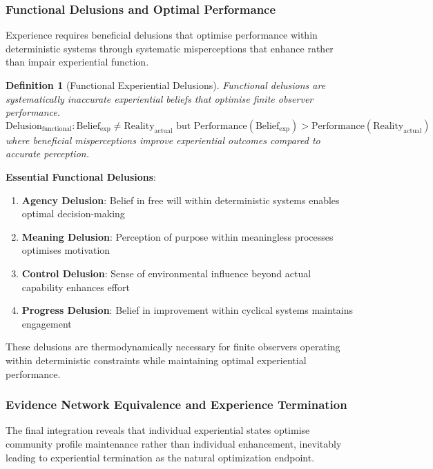 \documentclass{article}
\newtheorem{definition}[theorem]{Definition}
\begin{document}
\subsubsection{Functional Delusions and Optimal Performance}

Experience requires beneficial delusions that optimise performance within deterministic systems through systematic misperceptions that enhance rather than impair experiential function.

\begin{definition}[Functional Experiential Delusions]
Functional delusions are systematically inaccurate experiential beliefs that optimise finite observer performance.
\begin{equation}
\text{Delusion}_{\text{functional}}: \text{Belief}_{\text{exp}} \neq \text{Reality}_{\text{actual}} \text{ but } \text{Performance}(\text{Belief}_{\text{exp}}) > \text{Performance}(\text{Reality}_{\text{actual}})
\end{equation}
where beneficial misperceptions improve experiential outcomes compared to accurate perception.
\end{definition}

\textbf{Essential Functional Delusions}:

\begin{enumerate}
\item \textbf{Agency Delusion}: Belief in free will within deterministic systems enables optimal decision-making
\item \textbf{Meaning Delusion}: Perception of purpose within meaningless processes optimises motivation  
\item \textbf{Control Delusion}: Sense of environmental influence beyond actual capability enhances effort
\item \textbf{Progress Delusion}: Belief in improvement within cyclical systems maintains engagement
\end{enumerate}

These delusions are thermodynamically necessary for finite observers operating within deterministic constraints while maintaining optimal experiential performance.

\subsubsection{Evidence Network Equivalence and Experience Termination}

The final integration reveals that individual experiential states optimise community profile maintenance rather than individual enhancement, inevitably leading to experiential termination as the natural optimization endpoint.
\end{document}
